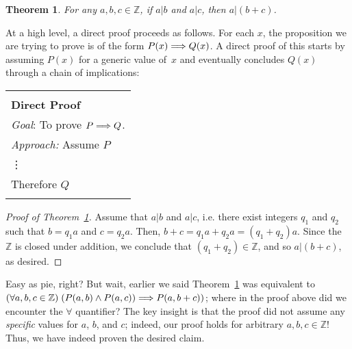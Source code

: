 \documentclass[11pt]{article}
\newcounter{thm}
\newtheorem{theorem}{Theorem}[thm]
\begin{document}
\begin{theorem}\label{thm:divides}
    For any $a,b,c\in \mathbb{Z}$, if $a|b$ and $a|c$, then $a|(b+c)$.
\end{theorem}



At a high level, a direct proof proceeds as follows. For each $x$, the proposition we are trying to prove is of the form $P(x) \Longrightarrow Q(x)$. A direct proof of this starts by assuming $P(x)$ for a generic value of~$x$  and eventually concludes $Q(x)$ through a chain of implications:
\vspace{.2cm}

\begin{tabular}{|l|}
 \hline \\
        {\bf Direct Proof}\\
        \hspace{.5cm}\emph{Goal}: To prove $P \Longrightarrow Q$. \\
        \hspace{.5cm}\emph{Approach:} Assume $P$ \\
  \hspace{2.9cm}\vdots \\
  \hspace{2.2cm}Therefore $Q$ \\ \\
 \hline
\end{tabular}

\vspace{.2cm}


\begin{proof}[Proof of Theorem~\ref{thm:divides}] Assume that $a|b$ and $a|c$, i.e. there exist integers $q_1$ and $q_2$ such that $b=q_1a$ and $c=q_2a$.
Then, $b+c=q_1a+q_2a=(q_1+q_2)a$. Since the $\mathbb{Z}$ is closed under addition, we conclude that $(q_1+q_2)\in\mathbb{Z}$, and so $a|(b+c)$, as desired.
\end{proof}

Easy as pie, right? But wait, earlier we said Theorem~\ref{thm:divides} was equivalent to $(\forall a,b,c\in\mathbb{Z})\;(P(a,b)\wedge P(a,c))\Longrightarrow P(a,b+c))$; where in the proof above did we encounter the $\forall$ quantifier? The key insight is that the proof did not assume any \emph{specific} values for $a$, $b$, and $c$; indeed, our proof holds for {arbitrary} $a,b,c\in\mathbb{Z}$! Thus, we have indeed proven the desired claim.
\end{document}
